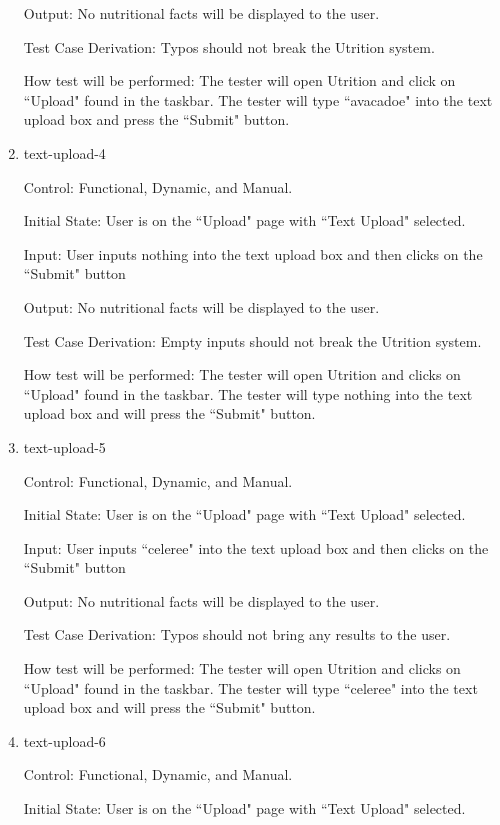 \documentclass[12pt, titlepage]{article}
\begin{document}
\begin{enumerate}
	Output: No nutritional facts will be displayed to the user.
	
	Test Case Derivation: Typos should not break the Utrition system.
	
	How test will be performed: The tester will open Utrition and click on ``Upload" found in the taskbar. The tester will type ``avacadoe" into the text upload box and press the ``Submit" button.
	
	\item{text-upload-4\\}
	
	Control: Functional, Dynamic, and Manual.
	
	Initial State: User is on the ``Upload" page with ``Text Upload" selected.
	
	Input: User inputs nothing into the text upload box and then clicks on the ``Submit" button
	
	Output: No nutritional facts will be displayed to the user.
	
	Test Case Derivation: Empty inputs should not break the Utrition system.
	
	How test will be performed: The tester will open Utrition and clicks on ``Upload" found in the taskbar. The tester will type nothing into the text upload box and will press the ``Submit" button.
	
	\item{text-upload-5\\}
	
	Control: Functional, Dynamic, and Manual.
	
	Initial State: User is on the ``Upload" page with ``Text Upload" selected.
	
	Input: User inputs ``celeree" into the text upload box and then clicks on the ``Submit" button
	
	Output: No nutritional facts will be displayed to the user.
	
	Test Case Derivation: Typos should not bring any results to the user.
	
	How test will be performed: The tester will open Utrition and clicks on ``Upload" found in the taskbar. The tester will type ``celeree" into the text upload box and will press the ``Submit" button.
	
	\item{text-upload-6\\}
	
	Control: Functional, Dynamic, and Manual.
	
	Initial State: User is on the ``Upload" page with ``Text Upload" selected.
	

\end{enumerate}
\end{document}
